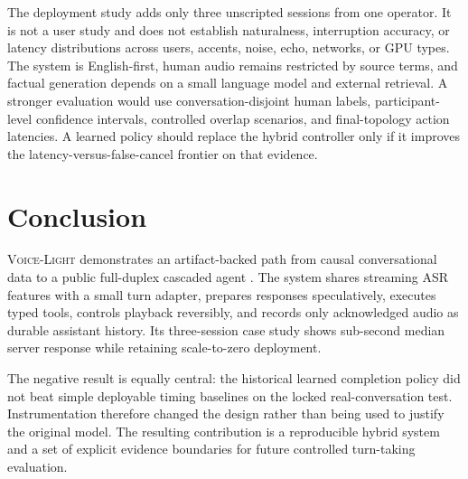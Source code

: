 \documentclass[10pt,twocolumn]{article}
\newcommand{\VoiceLight}{\textsc{Voice-Light}}
\begin{document}
The deployment study adds only three unscripted sessions from one operator. It is not a user study
and does not establish naturalness, interruption accuracy, or latency distributions across users,
accents, noise, echo, networks, or GPU types. The system is English-first, human audio remains
restricted by source terms, and factual generation depends on a small language model and external
retrieval. A stronger evaluation would use conversation-disjoint human labels, participant-level
confidence intervals, controlled overlap scenarios, and final-topology action latencies. A learned
policy should replace the hybrid controller only if it improves the latency-versus-false-cancel
frontier on that evidence.

\section{Conclusion}

\VoiceLight{} demonstrates an artifact-backed path from causal conversational data to a public
full-duplex cascaded agent \cite{demo,voice-light}. The system shares streaming ASR features with a
small turn adapter, prepares responses speculatively, executes typed tools, controls playback
reversibly, and records only acknowledged audio as durable assistant history. Its three-session
case study shows sub-second median server response while retaining scale-to-zero deployment.

The negative result is equally central: the historical learned completion policy did not beat
simple deployable timing baselines on the locked real-conversation test. Instrumentation therefore
changed the design rather than being used to justify the original model. The resulting contribution
is a reproducible hybrid system and a set of explicit evidence boundaries for future controlled
turn-taking evaluation.
\end{document}
